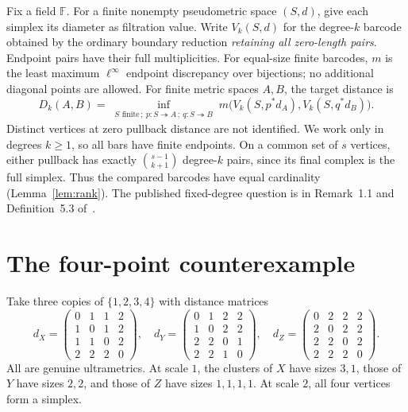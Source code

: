 \documentclass[11pt]{article}
\theoremstyle{remark}
\newcommand{\F}{\mathbb F}
\begin{document}
Fix a field $\F$. For a finite nonempty pseudometric space $(S,d)$, give each
simplex its diameter as filtration value. Write $V_k(S,d)$ for the degree-$k$
barcode obtained by the ordinary boundary reduction \emph{retaining all
zero-length pairs}. Endpoint pairs have their full multiplicities.
For equal-size finite barcodes, $m$ is the least maximum $\ell^\infty$
endpoint discrepancy over bijections; no additional diagonal points are
allowed. For finite metric spaces $A,B$, the target distance is
\begin{equation}
D_k(A,B)=\inf_{\substack{S\text{ finite}\,;\ p:S\twoheadrightarrow A\,;\ q:S\twoheadrightarrow B}}
 m\bigl(V_k(S,p^*d_A),V_k(S,q^*d_B)\bigr).
\label{eq:target}
\end{equation}
Distinct vertices at zero pullback distance are not identified. We work
only in degrees $k\ge1$, so all bars have finite endpoints. On a common
set of $s$ vertices, either pullback has exactly $\binom{s-1}{k+1}$
degree-$k$ pairs, since its final complex is the full simplex. Thus the
compared barcodes have equal cardinality (Lemma~\ref{lem:rank}). The published
fixed-degree question is in Remark~1.1 and Definition~5.3 of~\cite{mz}.

\section{The four-point counterexample}
Take three copies of $\{1,2,3,4\}$ with distance matrices
\begin{equation}
 d_X=\begin{pmatrix}
0&1&1&2\\1&0&1&2\\1&1&0&2\\2&2&2&0
\end{pmatrix},\quad
 d_Y=\begin{pmatrix}
0&1&2&2\\1&0&2&2\\2&2&0&1\\2&2&1&0
\end{pmatrix},\quad
 d_Z=\begin{pmatrix}
0&2&2&2\\2&0&2&2\\2&2&0&2\\2&2&2&0
\end{pmatrix}.
\label{eq:matrices}
\end{equation}
All are genuine ultrametrics. At scale $1$, the clusters of $X$ have sizes
$3,1$, those of $Y$ have sizes $2,2$, and those of $Z$ have sizes $1,1,1,1$.
At scale $2$, all four vertices form a simplex.
\end{document}
